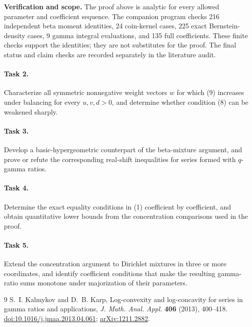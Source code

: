 \documentclass[10pt]{article}
\begin{document}
\noindent\textbf{Verification and scope.}
The proof above is analytic for every allowed parameter and coefficient
sequence. The companion program checks 216 independent beta moment
identities, 24 coin-kernel cases, 225 exact Bernstein-density cases,
9 gamma integral evaluations, and 135 full coefficients. These finite
checks support the identities; they are not substitutes for the proof.
The final status and claim checks are recorded separately in the
literature audit.

\paragraph{Task 2.}
Characterize all symmetric nonnegative weight vectors \(w\) for which
(9) increases under balancing for every \(u,v,d>0\), and determine
whether condition (8) can be weakened sharply.

\paragraph{Task 3.}
Develop a basic-hypergeometric counterpart of the beta-mixture argument,
and prove or refute the corresponding real-shift inequalities for
series formed with \(q\)-gamma ratios.

\paragraph{Task 4.}
Determine the exact equality conditions in (1) coefficient by
coefficient, and obtain quantitative lower bounds from the
concentration comparisons used in the proof.

\paragraph{Task 5.}
Extend the concentration argument to Dirichlet mixtures in three or more
coordinates, and identify coefficient conditions that make the resulting
gamma-ratio sums monotone under majorization of their parameters.

\begin{thebibliography}{9}
S.~I. Kalmykov and D.~B. Karp,
Log-convexity and log-concavity for series in gamma ratios and applications,
\emph{J. Math. Anal. Appl.} \textbf{406} (2013), 400--418.
\href{https://doi.org/10.1016/j.jmaa.2013.04.061}{doi:10.1016/j.jmaa.2013.04.061};
\href{https://arxiv.org/abs/1211.2882}{arXiv:1211.2882}.
\end{thebibliography}
\end{document}
